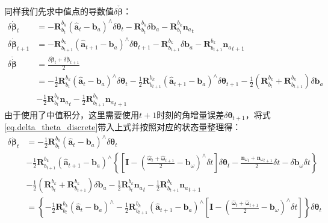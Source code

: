 \begin{enumerate}
	同样我们先求中值点的导数值$\overline{\delta\dot{\bm{\beta}}}$：
	\begin{equation}
	\begin{aligned}
	\delta\dot{\bm{\beta}}_t&=-\bm{R}_{b_t}^{b_k}\left(\hat{\bm{a}}_t-\bm{b}_a\right)^\wedge\delta\bm{\theta}_t-\bm{R}_{b_t}^{b_k}\delta\bm{b}_a-\bm{R}_{b_t}^{b_k}{\bm{n}_a}_t\\
	\delta\dot{\bm{\beta}}_{t+1}&=-\bm{R}_{b_{t+1}}^{b_k}\left(\hat{\bm{a}}_{t+1}-\bm{b}_a\right)^\wedge\delta\bm{\theta}_{t+1}-\bm{R}_{b_{t+1}}^{b_k}\delta\bm{b}_a-\bm{R}_{b_{t+1}}^{b_k}{\bm{n}_a}_{t+1}\\
	\overline{\delta\dot{\bm{\beta}}}&=\frac{\delta\dot{\bm{\beta}}_t+\delta\dot{\bm{\beta}}_{t+1}}{2}\\
	&=-\frac{1}{2}\bm{R}_{b_t}^{b_k}\left(\hat{\bm{a}}_t-\bm{b}_a\right)^\wedge\delta\bm{\theta}_t-\frac{1}{2}\bm{R}_{b_{t+1}}^{b_k}\left(\hat{\bm{a}}_{t+1}-\bm{b}_a\right)^\wedge\delta\bm{\theta}_{t+1}-\frac{1}{2}\left(\bm{R}_{b_t}^{b_k}+\bm{R}_{b_{t+1}}^{b_k}\right)\delta\bm{b}_a\\
	&-\frac{1}{2}\bm{R}_{b_t}^{b_k}{\bm{n}_a}_t-\frac{1}{2}\bm{R}_{b_{t+1}}^{b_k}{\bm{n}_a}_{t+1}
	\end{aligned}
	\end{equation}
	由于使用了中值积分，这里需要使用$t+1$时刻的角增量误差$\delta\bm{\theta}_{t+1}$，将式\ref{eq.delta_theta_discrete}带入上式并按照对应的状态量整理得：
	\begin{equation}
	\begin{aligned}
		\delta\dot{\bm{\beta}}_t&=-\frac{1}{2}\bm{R}_{b_t}^{b_k}\left(\hat{\bm{a}}_t-\bm{b}_a\right)^\wedge\delta\bm{\theta}_t\\
		&-\frac{1}{2}\bm{R}_{b_{t+1}}^{b_k}\left(\hat{\bm{a}}_{t+1}-\bm{b}_a\right)^\wedge\left\{\left[\bm{I}-\left(\frac{\hat{\bm{\omega}}_t+\hat{\bm{\omega}}_{t+1}}{2}-\bm{b}_\omega\right)^\wedge\delta t\right]\delta\bm{\theta}_t-\frac{{\bm{n}_\omega}_t+{\bm{n}_\omega}_{t+1}}{2}\delta t-\delta\bm{b}_\omega\delta t\right\}\\
		&-\frac{1}{2}\left(\bm{R}_{b_t}^{b_k}+\bm{R}_{b_{t+1}}^{b_k}\right)\delta\bm{b}_a-\frac{1}{2}\bm{R}_{b_t}^{b_k}{\bm{n}_a}_t-\frac{1}{2}\bm{R}_{b_{t+1}}^{b_k}{\bm{n}_a}_{t+1}\\
		&=\left\{-\frac{1}{2}\bm{R}_{b_t}^{b_k}\left(\hat{\bm{a}}_t-\bm{b}_a\right)^\wedge-\frac{1}{2}\bm{R}_{b_{t+1}}^{b_k}\left(\hat{\bm{a}}_{t+1}-\bm{b}_a\right)^\wedge\left[\bm{I}-\left(\frac{\hat{\bm{\omega}}_t+\hat{\bm{\omega}}_{t+1}}{2}-\bm{b}_\omega\right)^\wedge\delta t\right]\right\}\delta\bm{\theta}_t\\

\end{aligned}
\end{equation}
\end{enumerate}
